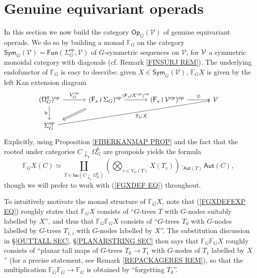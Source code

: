 \documentclass[a4paper,10pt]{article}%
\begin{document}
\section{Genuine equivariant operads}\label{GENUINE_OP_MONAD_SECTION}


In this section we now build the category 
$\mathsf{Op}_G (\mathcal{V})$
of genuine equivariant operads.
We do so by building a monad $\mathbb{F}_G$
on the category
$\mathsf{Sym}_G(\mathcal{V}) = 
\mathsf{Fun}(\Sigma_G^{op},\mathcal{V})$
of $G$-symmetric sequences on $\mathcal{V}$, for $\mathcal V$ a symmetric monoidal category with diagonals 
(cf. Remark \ref{FINSURJ REM}).
The underlying endofunctor of $\mathbb{F}_G$ is easy to describe:
given $X \in \mathsf{Sym}_G(\mathcal{V})$, $\mathbb{F}_G X$ is given by the left Kan extension diagram
\begin{equation}\label{FGXDEF EQ}
\begin{tikzcd}[row sep=2em,column sep = 3.3em]
	(\Omega_{G}^{0})^{op} \ar{r}{V_{G}^{op}} \ar{d}[swap]{\mathsf{lr}} &
	|[alias=F1]|
(\Fin_s \wr \Sigma_G)^{op} \ar{r}[swap,name=F2]{}{(\Fin_s \wr X^{op})^{op}}& (\Fin_s \wr \mathcal{V}^{op})^{op} \ar{r}{\otimes} & \mathcal{V}
\\
	|[alias=G2]|
	\Sigma_G^{op}  \ar{urrr}[swap]{\mathbb{F}_G X} & &
\arrow[Rightarrow, from=F1, to=G2,shorten >=0.25cm,shorten <=0.35cm]
\end{tikzcd}
\end{equation}
Explicitly, using Proposition \ref{FIBERKANMAP PROP}
	and the fact that 
	the rooted under categories
	$C \downarrow_{\mathsf{r}} \Omega_G^0$
	are groupoids
	yields the formula
\begin{equation}\label{FGXDEFEXP EQ}
\mathbb{F}_G X (C) \simeq
\coprod_{T \in 
\mathsf{Iso}(C \downarrow_{\mathsf{r}} \Omega_G^0)}
\left(
\bigotimes_{v \in V_G(T)}
 X(T_v)
\right) 
\cdot_{\mathsf{Aut}(T)} \mathsf{Aut}(C),
\end{equation}
though we will prefer to work with (\ref{FGXDEF EQ}) throughout.

To intuitively motivate the monad structure of $\mathbb{F}_G X$, note that 
(\ref{FGXDEFEXP EQ}) roughly states that 
$\mathbb{F}_G X$ consists of ``$G$-trees $T$ with $G$-nodes suitably labelled by $X$'', 
and thus that $\mathbb{F}_G \mathbb{F}_G X$
consists of ``$G$-trees $T_0$ with $G$-nodes labelled 
by $G$-trees $T_{1,i}$ with $G$-nodes labelled by $X$''.
The substitution discussion in 
\S \ref{OUTTALL SEC}, 
\S \ref{PLANARSTRING SEC}
then says that $\mathbb{F}_G \mathbb{F}_G X$ roughly consists of ``planar tall maps of $G$-trees $T_0 \to T_1$ with $G$-nodes of $T_1$ labelled by $X$'' (for a precise statement, see Remark \ref{REPACKAGERES REM}),
so that the multiplication
$\mathbb{F}_G \mathbb{F}_G \to \mathbb{F}_G$
is obtained by ``forgetting $T_0$''.
\end{document}
